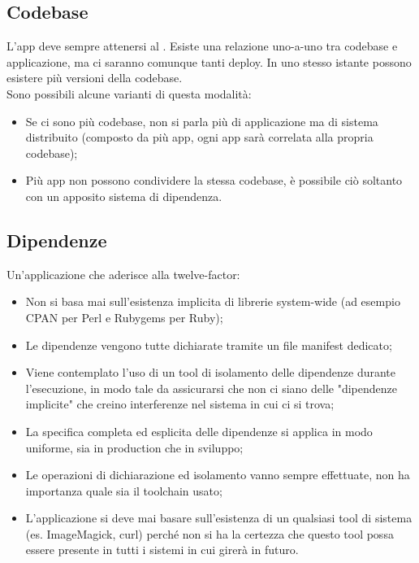 \documentclass[PianoDiQualifica.tex]{subfiles}
\begin{document}
\subsection{Codebase}
L'app deve sempre attenersi al . Esiste una relazione uno-a-uno tra codebase e applicazione, ma ci saranno comunque tanti deploy. In uno stesso istante possono esistere più versioni della codebase.\\
Sono possibili alcune varianti di questa modalità:
\begin{itemize}
\item Se ci sono più codebase, non si parla più di applicazione ma di sistema distribuito (composto da più app, ogni app sarà correlata alla propria codebase);
\item Più app non possono condividere la stessa codebase, è possibile ciò soltanto con un apposito sistema di dipendenza.
\end{itemize}

\subsection{Dipendenze}
Un'applicazione che aderisce alla twelve-factor:
\begin{itemize}
\item Non si basa mai sull'esistenza implicita di librerie system-wide (ad esempio CPAN per Perl e Rubygems per Ruby);
\item Le dipendenze vengono tutte dichiarate tramite un file manifest dedicato;
\item Viene contemplato l'uso di un tool di isolamento delle dipendenze durante l'esecuzione, in modo tale da assicurarsi che non ci siano delle "dipendenze implicite" che creino interferenze nel sistema in cui ci si trova;
\item La specifica completa ed esplicita delle dipendenze si applica in modo uniforme, sia in production che in sviluppo;
\item Le operazioni di dichiarazione ed isolamento vanno sempre effettuate, non ha importanza quale sia il toolchain usato;
\item L'applicazione si deve mai basare sull'esistenza di un qualsiasi tool di sistema (es. ImageMagick, curl) perché non si ha la certezza che questo tool possa essere presente in tutti i sistemi in cui girerà in futuro.
\end{itemize}
\end{document}
